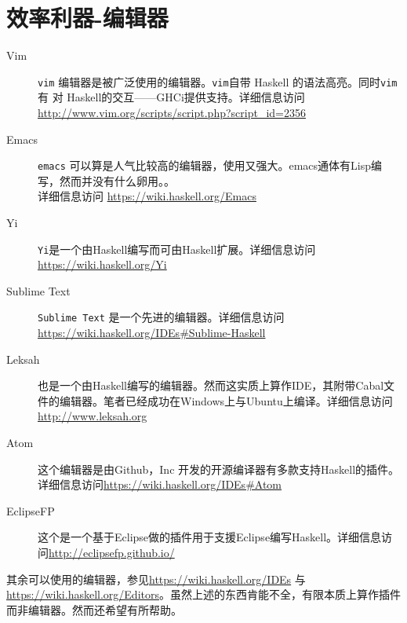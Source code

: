 \section{效率利器-编辑器}
\begin{description}
  \item[Vim]\verb"vim" 编辑器是被广泛使用的编辑器。\verb"vim"自带 Haskell 的语法高亮。同时\verb"vim" 有 对 Haskell的交互——GHCi提供支持。详细信息访问\url{http://www.vim.org/scripts/script.php?script_id=2356}   
  \item[Emacs]\verb"emacs" 可以算是人气比较高的编辑器，使用又强大。emacs通体有Lisp编写，然而并没有什么卵用。。\\ 详细信息访问
  \url{https://wiki.haskell.org/Emacs}
  \item[Yi]\verb"Yi"是一个由Haskell编写而可由Haskell扩展。详细信息访问\url{https://wiki.haskell.org/Yi}
  \item[Sublime Text] \verb"Sublime Text" 是一个先进的编辑器。详细信息访问\url{https://wiki.haskell.org/IDEs#Sublime-Haskell}
  \item[Leksah] 也是一个由Haskell编写的编辑器。然而这实质上算作IDE，其附带Cabal文件的编辑器。笔者已经成功在Windows上与Ubuntu上编译。详细信息访问\url{http://www.leksah.org}
  \item[Atom] 这个编辑器是由Github，Inc 开发的开源编译器有多款支持Haskell的插件。详细信息访问\url{https://wiki.haskell.org/IDEs#Atom}
  \item[EclipseFP] 这个是一个基于Eclipse做的插件用于支援Eclipse编写Haskell。详细信息访问\url{http://eclipsefp.github.io/}
\end{description}
其余可以使用的编辑器，参见\url{https://wiki.haskell.org/IDEs} 与 \url{https://wiki.haskell.org/Editors}。虽然上述的东西肯能不全，有限本质上算作插件而非编辑器。然而还希望有所帮助。
\endinput 